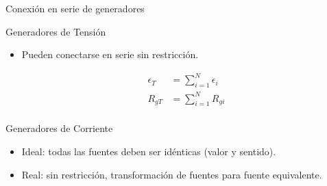 \documentclass[aspectratio=169, usenames,svgnames,dvipsnames]{beamer}
\begin{document}
\begin{frame}[label={sec:org6970c2d}]{Conexión en serie de generadores}
\begin{block}{Generadores de Tensión}
\begin{itemize}
\item Pueden conectarse en serie sin restricción.

\begin{align*}
  \epsilon_T &= \sum_{i = 1}^N \epsilon_i\\
  R_{gT} &= \sum_{i = 1}^N R_{gi}\\ 
\end{align*}
\end{itemize}
\end{block}

\begin{block}{Generadores de Corriente}
\begin{itemize}
\item Ideal: todas las fuentes deben ser idénticas (valor y sentido).
\item Real:  sin restricción, transformación de fuentes para fuente equivalente.
\end{itemize}
\end{block}
\end{frame}
\end{document}
